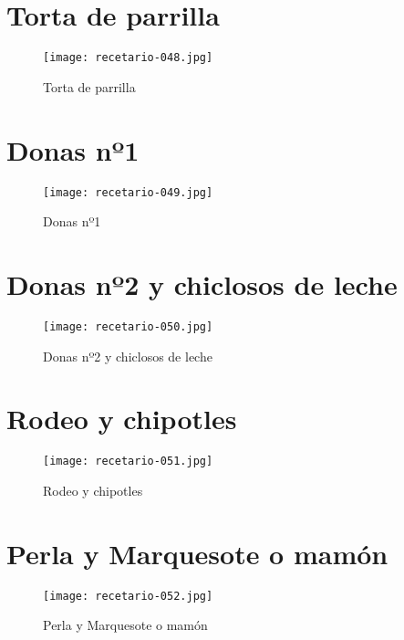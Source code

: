 \documentclass[12pt,letterpaper]{article}
\begin{document}
\newpage

\section{Torta de parrilla}

  \begin{figure}[H]
    \vspace{2pt}
  \texttt{[image: recetario-048.jpg]}
    \caption{Torta de parrilla}
    
  \end{figure}

\newpage

\section{Donas nº1}
  \begin{figure}[H]
    \vspace{2pt}
  \texttt{[image: recetario-049.jpg]}
    \caption{Donas nº1}
    
  \end{figure}

\newpage

\section{Donas nº2 y chiclosos de leche}
  \begin{figure}[H]
    \vspace{2pt}
  \texttt{[image: recetario-050.jpg]}
    \caption{Donas nº2 y chiclosos de leche}
    
  \end{figure}

\newpage

\section{Rodeo y chipotles}
  \begin{figure}[H]
    \vspace{2pt}
  \texttt{[image: recetario-051.jpg]}
    \caption{Rodeo y chipotles}
    
  \end{figure}

\newpage

\section{Perla y Marquesote o mamón}
  \begin{figure}[H]
    \vspace{2pt}
  \texttt{[image: recetario-052.jpg]}
    \caption{Perla y Marquesote o mamón}
    
  \end{figure}
\end{document}
